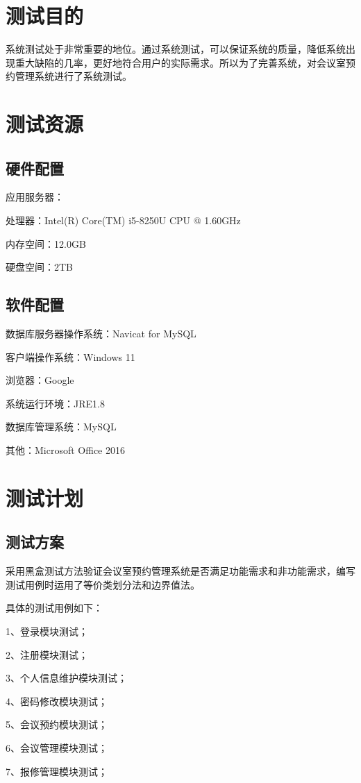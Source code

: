 \documentclass{izdthesis}
\begin{document}
\section{测试目的}
系统测试处于非常重要的地位。通过系统测试，可以保证系统的质量，降低系统出现重大缺陷的几率，更好地符合用户的实际需求\cite{ref13}。所以为了完善系统，对会议室预约管理系统进行了系统测试。

\section{测试资源}
\subsection{硬件配置}
应用服务器：

处理器：Intel(R) Core(TM) i5-8250U CPU @ 1.60GHz

内存空间：12.0GB

硬盘空间：2TB

\subsection{软件配置}
数据库服务器操作系统：Navicat for MySQL

客户端操作系统：Windows 11

浏览器：Google

系统运行环境：JRE1.8

数据库管理系统：MySQL

其他：Microsoft Office 2016

\section{测试计划}
\subsection{测试方案}
采用黑盒测试方法验证会议室预约管理系统是否满足功能需求和非功能需求，编写测试用例时运用了等价类划分法和边界值法。

具体的测试用例如下：

1、登录模块测试；

2、注册模块测试；

3、个人信息维护模块测试；

4、密码修改模块测试；

5、会议预约模块测试；

6、会议管理模块测试；

7、报修管理模块测试；
\end{document}
